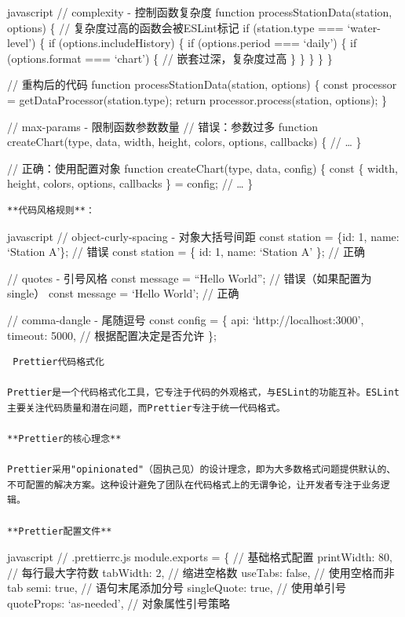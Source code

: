 {{javascript // complexity - 控制函数复杂度 function processStationData(station, options) \{ // 复杂度过高的函数会被ESLint标记 if (station.type === `water-level') \{ if (options.includeHistory) \{ if (options.period === `daily') \{ if (options.format === `chart') \{ // 嵌套过深，复杂度过高 \} \} \} \} \}

// 重构后的代码 function processStationData(station, options) \{ const processor = getDataProcessor(station.type); return processor.process(station, options); \}

// max-params - 限制函数参数数量 // 错误：参数过多 function createChart(type, data, width, height, colors, options, callbacks) \{ // \ldots{} \}

// 正确：使用配置对象 function createChart(type, data, config) \{ const \{ width, height, colors, options, callbacks \} = config; // \ldots{} \}

\begin{lstlisting}
**代码风格规则**：
\end{lstlisting}

javascript // object-curly-spacing - 对象大括号间距 const station = \{id: 1, name: `Station A'\}; // 错误 const station = \{ id: 1, name: `Station A' \}; // 正确

// quotes - 引号风格 const message = ``Hello World''; // 错误（如果配置为single） const message = `Hello World'; // 正确

// comma-dangle - 尾随逗号 const config = \{ api: `http://localhost:3000', timeout: 5000, // 根据配置决定是否允许 \};

\begin{lstlisting}
 Prettier代码格式化

Prettier是一个代码格式化工具，它专注于代码的外观格式，与ESLint的功能互补。ESLint主要关注代码质量和潜在问题，而Prettier专注于统一代码格式。

**Prettier的核心理念**

Prettier采用"opinionated"（固执己见）的设计理念，即为大多数格式问题提供默认的、不可配置的解决方案。这种设计避免了团队在代码格式上的无谓争论，让开发者专注于业务逻辑。

**Prettier配置文件**
\end{lstlisting}

javascript // .prettierrc.js module.exports = \{ // 基础格式配置 printWidth: 80, // 每行最大字符数 tabWidth: 2, // 缩进空格数 useTabs: false, // 使用空格而非tab semi: true, // 语句末尾添加分号 singleQuote: true, // 使用单引号 quoteProps: `as-needed', // 对象属性引号策略

}}
